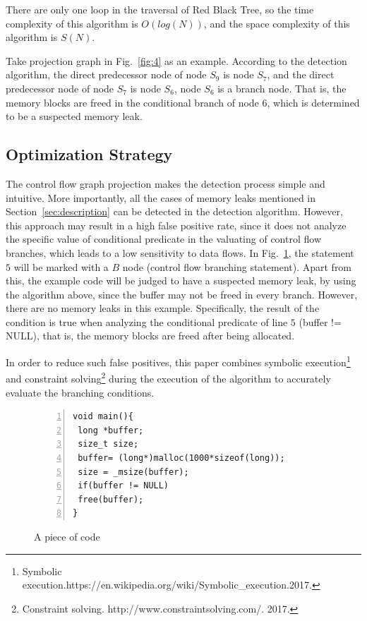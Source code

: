 There are only one loop in the traversal of Red Black Tree, so the time complexity of this algorithm is $O(log(N))$, and the space complexity of this algorithm is $S(N)$.

Take projection graph in Fig.~\ref{fig:4} as an example. According to the detection algorithm, the direct predecessor node of node $S_9$ is node $S_7$, and the direct predecessor node of node $S_7$ is node $S_6$, node $S_6$ is a branch node. That is, the memory blocks are freed in the conditional branch of node $6$, which is determined to be a suspected memory leak.

\subsection{Optimization Strategy}

The control flow graph projection makes the detection process simple and intuitive. More importantly, all the cases of memory leaks mentioned in Section~\ref{sec:description} can be detected in the detection algorithm. However, this approach may result in a high false positive rate, since it does not analyze the specific value of conditional predicate in the valuating of control flow branches, which leads to a low sensitivity to data flows. In Fig.~\ref{fig:7}, the statement $5$ will be marked with a $B$ node (control flow branching statement). Apart from this, the example code will be judged to have a suspected memory leak, by using the algorithm above, since the buffer may not be freed in every branch. However, there are no memory leaks in this example. Specifically, the result of the condition is true when analyzing the conditional predicate of line $5$ (buffer != NULL), that is, the memory blocks are freed after being allocated. 

In order to reduce such false positives, this paper combines symbolic execution\footnote{Symbolic execution.https://en.wikipedia.org/wiki/Symbolic\_execution.2017.} and constraint solving\footnote{Constraint solving. http://www.constraintsolving.com/. 2017.} during the execution of the algorithm to accurately evaluate the branching conditions.
%
\begin{figure}[!h]
\small
\centering
\begin{lstlisting}[frame=single,framexrightmargin=-10pt,numbers=left] 
void main(){
 long *buffer;
 size_t size;
 buffer= (long*)malloc(1000*sizeof(long));
 size = _msize(buffer);
 if(buffer != NULL)
 free(buffer);
}
\end{lstlisting}
\caption{A piece of code}\label{fig:7}
\end{figure}

